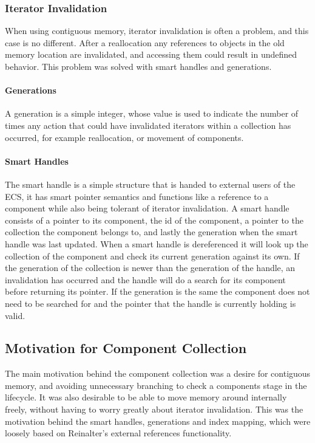 \subsubsection{Iterator Invalidation}
When using contiguous memory, iterator invalidation is often a problem, and this case is no different.
After a reallocation any references to objects in the old memory location are invalidated,
and accessing them could result in undefined behavior.
This problem was solved with smart handles and generations.

\paragraph{Generations}
A generation is a simple integer, whose value is used to indicate the number of times any action that
could have invalidated iterators within a collection has occurred, for example reallocation,
or movement of components.

\paragraph{Smart Handles}
The smart handle is a simple structure that is handed to external users of the ECS,
it has smart pointer semantics and functions like a reference to a component while also being tolerant of iterator invalidation.
A smart handle consists of a pointer to its component, the id of the component,
a pointer to the collection the component belongs to, and lastly the generation when the smart handle was last updated.
When a smart handle is dereferenced it will look up the collection of the component and check its current generation
against its own. If the generation of the collection is newer than the generation of the handle,
an invalidation has occurred and the handle will do a search for its component before returning its pointer.
If the generation is the same the component does not need to be searched for and the pointer that the handle is currently holding is valid.

\subsection{Motivation for Component Collection}
The main motivation behind the component collection was a desire for contiguous memory, and avoiding unnecessary
branching to check a components stage in the lifecycle.
It was also desirable to be able to move memory around internally freely, without having to worry greatly about
iterator invalidation. This was the motivation behind the smart handles, generations and index mapping, which were loosely based
on Reinalter\cite{molecular_matters_dod_external_references}'s external references functionality.

